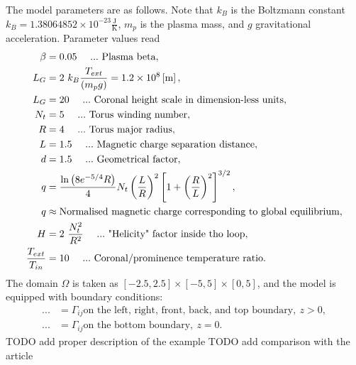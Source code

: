 The model parameters are as follows. Note that $k_B$ is the Boltzmann constant $k_B = 1.38064852 \times 10^{-23} \frac{\mathrm{J}}{\mathrm{K}}$, $m_p$ is the plasma mass, and $g$ gravitational acceleration. Parameter values read
\begin{align}
\nonumber \beta & =  0.05\ \ \ \ ...\ \text{Plasma beta},\\
\nonumber L_G & =  2\ k_B \frac{T_{ext}}{\lo m_p g \ro} = 1.2 \times 10^8 \left[\text{m}\right],\\
\nonumber L_G & =  20 \ \ \ \ ...\ \text{Coronal height scale in dimension-less units},\\
\nonumber N_t & = 5\ \ \ \ ...\ \text{Torus winding number},\\
\nonumber R & = 4\ \ \ \ ...\ \text{Torus major radius},\\
\nonumber L & = 1.5\ \ \ \ ...\ \text{Magnetic charge separation distance},\\
\nonumber d & =  1.5\ \ \ \ ...\ \text{Geometrical factor},\\
\nonumber q & =  \frac{\ln\lo 8 e^{-5/4} R\ro}{4} N_t \lo\frac{L}{R}\ro^2\left[1 + \lo\frac{R}{L}\ro^2\right]^{3/2},\\
\nonumber q & \approx \text{Normalised magnetic charge corresponding to global equilibrium},\\
\nonumber H & = 2\ \frac{N_t^2}{R^2}\ \ \ \ ...\ \text{"Helicity" factor inside tho loop},\\
\nonumber \frac{ T_{ext} }{T_{in}} & =  10\ \ \ \ ...\ \text{Coronal/prominence temperature ratio}.\\
\end{align}
The domain $\Omega$ is taken as $\left[-2.5, 2.5\right] \times \left[-5, 5\right] \times \left[0, 5\right]$, and the model is equipped with boundary conditions:
\begin{align}
... & = \Gamma_{ij} \text{on the left, right, front, back, and top boundary},\ z > 0,\\
... & = \Gamma_{ij} \text{on the bottom boundary},\ z = 0.
\end{align}
TODO add proper description of the example
TODO add comparison with the article